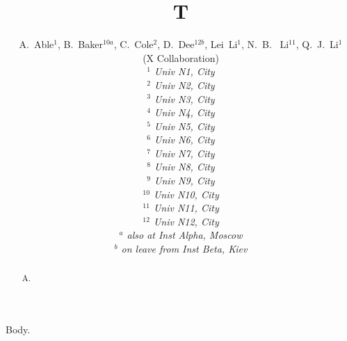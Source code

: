 \begin{frontmatter}
\title{T}
\author{
\begin{small}
A.~Able$^{1}$, B.~Baker$^{10a}$, C.~Cole$^{2}$, D.~Dee$^{12b}$, Lei~Li$^{1}$, N.~B. ~Li$^{11}$, Q.~J.~Li$^{1}$
\\
\vspace{0.2cm}
(X Collaboration)\\
\vspace{0.2cm} {\it
$^{1}$ Univ N1, City\\
$^{2}$ Univ N2, City\\
$^{3}$ Univ N3, City\\
$^{4}$ Univ N4, City\\
$^{5}$ Univ N5, City\\
$^{6}$ Univ N6, City\\
$^{7}$ Univ N7, City\\
$^{8}$ Univ N8, City\\
$^{9}$ Univ N9, City\\
$^{10}$ Univ N10, City\\
$^{11}$ Univ N11, City\\
$^{12}$ Univ N12, City\\
\vspace{0.2cm}
$^{a}$ also at Inst Alpha, Moscow\\
$^{b}$ on leave from Inst Beta, Kiev\\
\vspace{7cm}
}
\end{small}
}
\begin{abstract}
A.
\end{abstract}
\end{frontmatter}
Body.

